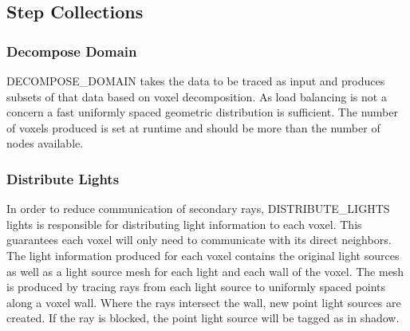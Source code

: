 \documentclass{vgtc}                          %
\begin{document}
\subsection{Step Collections}

\subsubsection{Decompose Domain}

DECOMPOSE\_DOMAIN takes the data to be traced as input and produces subsets of that data based on voxel decomposition.  As load balancing is not a concern a fast uniformly spaced geometric distribution is sufficient.  The number of voxels produced is set at runtime and should be more than the number of nodes available.

\subsubsection{Distribute Lights}

In order to reduce communication of secondary rays, DISTRIBUTE\_LIGHTS lights is responsible for distributing light information to each voxel.  This guarantees each voxel will only need to communicate with its direct neighbors.  The light information produced for each voxel contains the original light sources as well as a light source mesh for each light and each wall of the voxel.  The mesh is produced by tracing rays from each light source to uniformly spaced points along a voxel wall.  Where the rays intersect the wall, new point light sources are created.  If the ray is blocked, the point light source will be tagged as in shadow.
\end{document}
